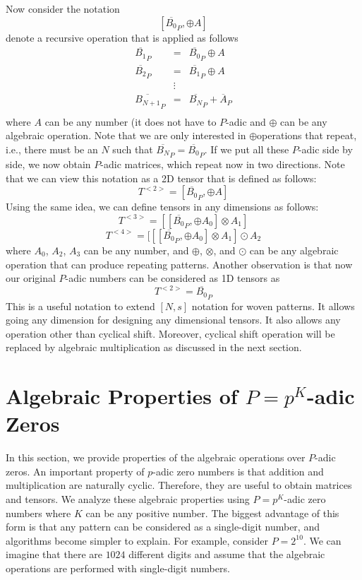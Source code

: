 \documentclass[times,twocolumn,final]{elsarticle}
\begin{document}
Now consider the notation
$$[\overline{B_0}_P, \oplus A ]$$
denote a recursive operation that is applied as follows 
\begin{eqnarray}
\overline{B_{1}}_P &=&\overline{B_{0}}_P \oplus A \nonumber\\
\overline{B_{2}}_P &=&\overline{B_{1}}_P \oplus A \nonumber\\
 &\vdots& \nonumber\\
\overline{B_{N+1}}_P &=&\overline{B_{N}}_P + \overline{A}_P \nonumber\\
\end{eqnarray}
where $A$ can be any number (it does not have to $P$-adic and $\oplus$ can be any algebraic operation. Note that we are only interested in $\oplus$operations that repeat, i.e., there must be an $N$ such that $\overline{B_{N}}_P =\overline{B_{0}}_P$. If we put all these $P$-adic side by side, we now obtain $P$-adic matrices, which repeat now in two directions. Note that we can view this notation as a 2D tensor that is defined as follows: 
$$T^{<2>}=[\overline{B_0}_P, \oplus A ]$$
Using the same idea, we can define tensors in any dimensions as follows:  
$$T^{<3>}=[[\overline{B_0}_P, \oplus A_0 ] \otimes A_1]$$
$$T^{<4>}=[[[\overline{B_0}_P, \oplus A_0 ] \otimes A_1] \odot A_2$$
where $A_0$, $A_2$, $A_3$ can be any number, and $\oplus$, $\otimes$, and $\odot$ can be any algebraic operation that can produce repeating patterns. 
Another observation is that now our original $P$-adic numbers can be considered as 1D tensors as 
$$T^{<2>}=\overline{B_0}_P$$
This is a useful notation to extend $[N,s]$ notation for woven patterns. It allows going any dimension for designing any dimensional tensors. It also allows any operation other than cyclical shift. Moreover, cyclical shift operation will be replaced by algebraic multiplication as discussed in the next section.  

\section{Algebraic Properties of $P=p^K$-adic Zeros}
\label{sec_appendix_padic_zero_operations}

In this section, we provide properties of the algebraic operations over $P$-adic zeros. An important property of $p$-adic zero numbers is that addition and multiplication are naturally cyclic. Therefore, they are useful to obtain matrices and tensors.  We analyze these algebraic properties using $P=p^K$-adic zero numbers where $K$ can be any positive number. The biggest advantage of this form is that any pattern can be considered as a single-digit number, and algorithms become simpler to explain. For example, consider $P=2^10$. We can imagine that there are $1024$ different digits and assume that the algebraic operations are performed with single-digit numbers.
\end{document}
